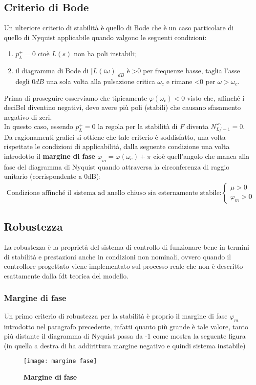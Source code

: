 \documentclass[a4paper]{article}
\begin{document}
	
	\subsection{Criterio di Bode}	
	Un ulteriore criterio di stabilità è quello di Bode che è un caso particolare di quello di Nyquist applicabile quando valgono le seguenti condizioni:
	\begin{enumerate}
		\item $ p_L^+=0 $ cioè $ L(s) $ non ha poli instabili;
		\item il diagramma di Bode di $ |L(i\omega)|_{dB} $ è >0 per frequenze basse, taglia l'asse degli $0dB$ una sola volta alla pulsazione critica $ \omega_c $ e rimane <0 per $ \omega>\omega_c $.		
	\end{enumerate}
	Prima di proseguire osserviamo che tipicamente $ \varphi(\omega_c)<0 $  visto che, affinché i deciBel diventino negativi, devo avere più poli (stabili) che causano sfasamento negativo di zeri.
	\\
	In questo caso, essendo $ p_L^+=0 $ la regola per la stabilità di $ F $ diventa $ N_{L/-1}^{\curvearrowleft}=0 $. Da ragionamenti grafici si ottiene che tale criterio è soddisfatto, una volta rispettate le condizioni di applicabilità, dalla seguente condizione una volta introdotto il \textbf{margine di fase} $\varphi_m=\varphi(\omega_c)+\pi$ cioè quell'angolo che manca alla fase del diagramma di Nyquist quando attraversa la circonferenza di raggio unitario (corrispondente a 0dB): \begin{align*}
	\text{Condizione affinché il sistema ad anello chiuso sia esternamente stabile:} \begin{cases}
	\mu>0\\
	\varphi_m>0
	\end{cases}
	\end{align*}
	
	\subsection{Robustezza}
	La robustezza è la proprietà del sistema di controllo di funzionare bene in termini di stabilità e prestazioni anche in condizioni non nominali, ovvero quando il controllore progettato viene implementato sul processo reale che non è descritto esattamente dalla fdt teorica del modello.
	
	\subsubsection{Margine di fase}
	Un primo criterio di robustezza per la stabilità è proprio il margine di fase $\varphi_m$ introdotto nel paragrafo precedente, infatti quanto più grande è tale valore, tanto più distante il diagramma di Nyquist passa da -1 come mostra la seguente figura (in quella a destra di ha addirittura margine negativo e quindi sistema instabile)
	\begin{figure}[H]
		\centering
		\texttt{[image: margine fase]}
		\caption{\textbf{Margine di fase}}
	\end{figure}
	
\end{document}
